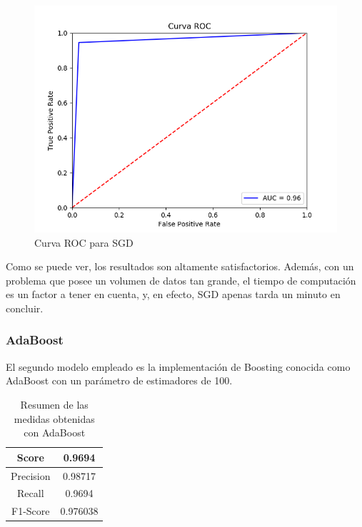 \begin{figure}[H] %
	\centering
	\includegraphics[scale=0.6]{ROC-SGD.png}  %
	\caption{Curva ROC para SGD} 
	\label{fig:roc-sgd}
\end{figure}

Como se puede ver, los resultados son altamente satisfactorios. Además, con un problema que posee un volumen de datos tan grande, el tiempo de computación es un factor a tener en cuenta, y, en efecto, SGD apenas tarda un minuto en concluir. 

\subsubsection{AdaBoost}

El segundo modelo empleado es la implementación de Boosting conocida como AdaBoost con un parámetro de estimadores de 100. 

\begin{table}[H]
	\centering
	\begin{tabular}{|c|c|}
		\hline
		Score     & 0.9694   \\ \hline
		Precision & 0.98717  \\ \hline
		Recall    & 0.9694   \\ \hline
		F1-Score  & 0.976038 \\ \hline
	\end{tabular}
	\caption{Resumen de las medidas obtenidas con AdaBoost}
\end{table}

